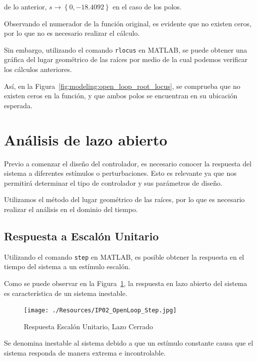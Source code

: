 \documentclass[12pt,a4paper]{article}
\begin{document}
        de lo anterior, \(s \rightarrow \left\{0, -18.4092\right\}\) en el caso de los polos. 

        Observando el numerador de la función original, es evidente que no existen ceros, por lo que no es necesario
        realizar el cálculo. 

        Sin embargo, utilizando el comando \verb|rlocus| en MATLAB, se puede obtener una gráfica del lugar geométrico
        de las raíces por medio de la cual podemos verificar los cálculos anteriores. 

        Así, en la Figura~\ref{fig:modeling:open_loop_root_locus}, se comprueba que no existen ceros en la función, 
        y que ambos polos se encuentran en su ubicación esperada.

    \pagebreak

    \section{Análisis de lazo abierto}

      Previo a comenzar el diseño del controlador, es necesario conocer la respuesta del sistema a diferentes 
      estímulos o perturbaciones. Esto es relevante ya que nos permitirá determinar el tipo de controlador 
      y sus parámetros de diseño. 

      Utilizamos el método del lugar geométrico de las raíces, por lo que es necesario realizar el análisis en el 
      dominio del tiempo. 

      \subsection{Respuesta a Escalón Unitario}

        Utilizando el comando \verb|step| en MATLAB, es posible obtener la respuesta en el tiempo del sistema 
        a un estímulo escalón.   

        Como se puede observar en la Figura~\ref{fig:response:open_loop_step_response}, la respuesta en lazo abierto 
        del sistema es característica de un sistema inestable. 

        \begin{figure}
          \centering
          \texttt{[image: ./Resources/IP02\_OpenLoop\_Step.jpg]}
          \caption{Respuesta Escalón Unitario, Lazo Cerrado}
          \label{fig:response:open_loop_step_response}
        \end{figure}

        Se denomina inestable al sistema debido a que un estímulo constante causa que el sistema responda
        de manera extrema e incontrolable. 
\end{document}
